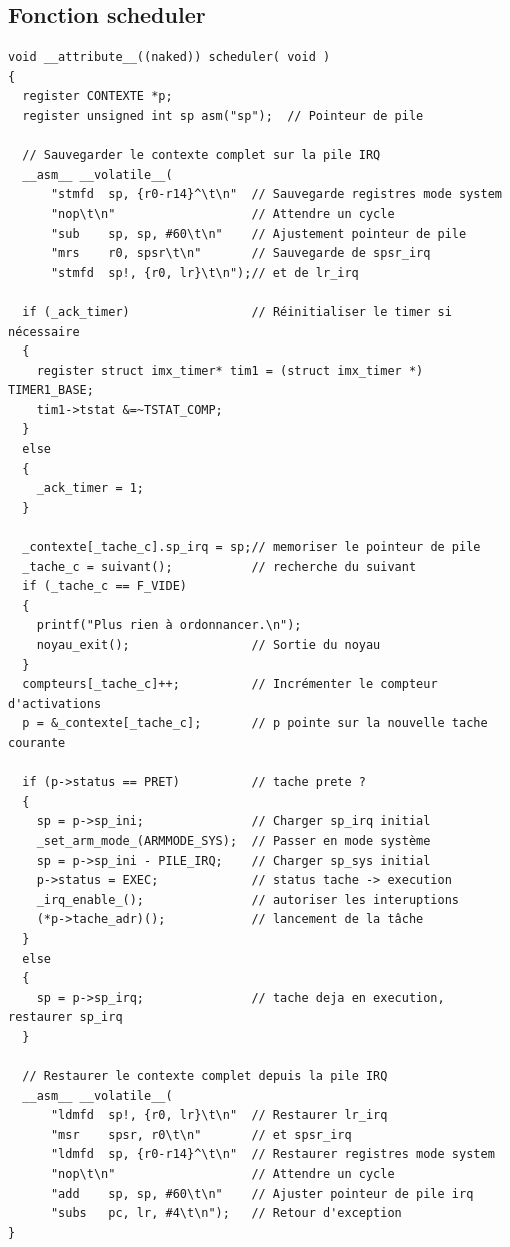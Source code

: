 \documentclass[a4paper,12pt]{report}
\begin{document}
\subsection{Fonction scheduler}
\begin{lstlisting}
void __attribute__((naked)) scheduler( void )
{
  register CONTEXTE *p;
  register unsigned int sp asm("sp");  // Pointeur de pile  

  // Sauvegarder le contexte complet sur la pile IRQ  
  __asm__ __volatile__(
      "stmfd  sp, {r0-r14}^\t\n"  // Sauvegarde registres mode system  
      "nop\t\n"                   // Attendre un cycle  
      "sub    sp, sp, #60\t\n"    // Ajustement pointeur de pile  
      "mrs    r0, spsr\t\n"       // Sauvegarde de spsr_irq  
      "stmfd  sp!, {r0, lr}\t\n");// et de lr_irq  

  if (_ack_timer)                 // Réinitialiser le timer si nécessaire  
  {
    register struct imx_timer* tim1 = (struct imx_timer *) TIMER1_BASE;
    tim1->tstat &=~TSTAT_COMP;
  }
  else
  {
    _ack_timer = 1;
  }

  _contexte[_tache_c].sp_irq = sp;// memoriser le pointeur de pile  
  _tache_c = suivant();           // recherche du suivant  
  if (_tache_c == F_VIDE)
  {
    printf("Plus rien à ordonnancer.\n");
    noyau_exit();                 // Sortie du noyau  
  }
  compteurs[_tache_c]++;          // Incrémenter le compteur d'activations   
  p = &_contexte[_tache_c];       // p pointe sur la nouvelle tache courante 

  if (p->status == PRET)          // tache prete ?  
  {
    sp = p->sp_ini;               // Charger sp_irq initial  
    _set_arm_mode_(ARMMODE_SYS);  // Passer en mode système  
    sp = p->sp_ini - PILE_IRQ;    // Charger sp_sys initial  
    p->status = EXEC;             // status tache -> execution  
    _irq_enable_();               // autoriser les interuptions    
    (*p->tache_adr)();            // lancement de la tâche  
  }
  else
  {
    sp = p->sp_irq;               // tache deja en execution, restaurer sp_irq  
  }

  // Restaurer le contexte complet depuis la pile IRQ  
  __asm__ __volatile__(
      "ldmfd  sp!, {r0, lr}\t\n"  // Restaurer lr_irq  
      "msr    spsr, r0\t\n"       // et spsr_irq  
      "ldmfd  sp, {r0-r14}^\t\n"  // Restaurer registres mode system  
      "nop\t\n"                   // Attendre un cycle  
      "add    sp, sp, #60\t\n"    // Ajuster pointeur de pile irq  
      "subs   pc, lr, #4\t\n");   // Retour d'exception  
}
\end{lstlisting}
\end{document}
